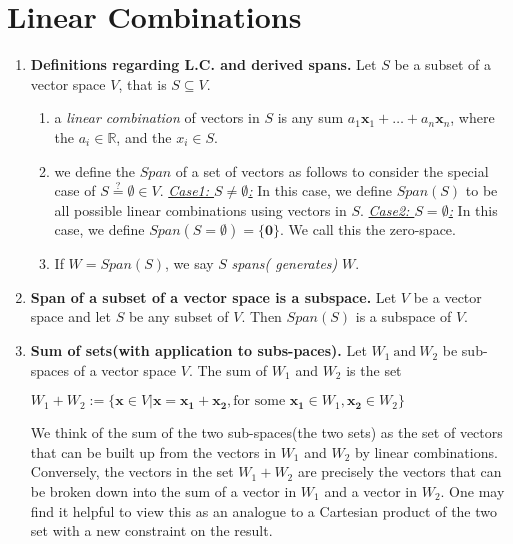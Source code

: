 \documentclass[oneside, 12pt]{book}
\newcommand{\settag}[1]{\renewcommand{\theenumi}{#1}}
\newcommand{\R}{\mathbb{R}}
\newcommand{\tit}[1]{\textit{#1}}
\newcommand{\vzero}{\mathbf{0}}
\begin{document}
\section{Linear Combinations}
    \begin{enumerate}
        \settag{1.3.1}
        \item \textbf{Definitions regarding L.C. and derived spans.} Let $S$ be a subset of a vector space $V$, that is $S\subseteq V$.
        \begin{enumerate}
            \item a \textit{linear combination} of vectors in $S$ is any sum $a_1\mathbf{x}_1 + \ldots + a_n\mathbf{x}_n$, where the $a_i \in \R$, and the $x_i \in S$.
            \item we define the $Span$ of a set of vectors as follows to consider the special case of $S\stackrel{?}{=}\emptyset \in V$.
            \newline \underline{\tit{Case1: $S\neq \emptyset$:}} In this case, we define $Span(S)$ to be all possible linear combinations using vectors in $S$.\newline
            \underline{\tit{Case2: $S= \emptyset$:}} In this case, we define $Span(S = \emptyset)=\{\vzero\}$. We call this the zero-space.
            
            \item If $W=Span(S)$, we say $S$ \textit{spans( generates)} $W$.
        \end{enumerate}
        
        \settag{1.3.4}
        \item \textbf{Span of a  subset of a vector space is a subspace.} Let $V$ be a vector space and let $S$ be any subset of $V$. Then $Span(S)$ is a subspace of $V$.
        
        \settag{1.3.5}
        \item \textbf{Sum of sets(with application to subs-paces).} Let $W_1~\text{and}~W_2$ be sub-spaces of a vector space $V$. The sum of $W_1$ and $W_2$ is the set
        \begin{center}
            $W_1+W_2 :=\{\mathbf{x}\in V |\mathbf{x}=\mathbf{x_1}+\mathbf{x_2}, \text{for some } \mathbf{x_1}\in W_1, \mathbf{x_2} \in W_2\}$
        \end{center}
        We think of the sum of the two sub-spaces(the two sets) as the set of vectors that can be built up from the vectors in $W_1$ and $W_2$ by linear combinations. Conversely, the vectors in the set $W_1+W_2$ are precisely the vectors that can be broken down into the sum of a vector in $W_1$ and a vector in $W_2$. One may find it helpful to view this as an analogue to a Cartesian product of the two set with a new constraint on the result.
        

\end{enumerate}
\end{document}
